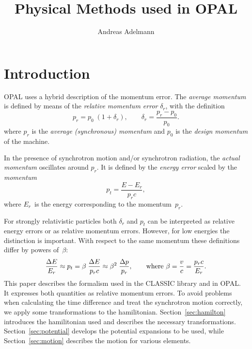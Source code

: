 \documentclass{report}
\begin{document}
\title{Physical Methods used in OPAL}
\author{Andreas Adelmann}

\maketitle


\section{Introduction}
OPAL uses a hybrid description of the momentum error.
The \textit{average momentum} is defined by means of the
\textit{relative momentum error} $\delta_r$, with the definition
\begin{equation}
  p_r = p_0\;(1+\delta_r), \qquad \delta_r = \frac{p_r - p_0}{p_0}.
\end{equation}
where $p_r$ is the \textit{average (synchronous) momentum} and $p_0$
is the \textit{design momentum} of the machine.

In the presence of synchrotron motion and/or synchrotron radiation,
the \textit{actual momentum} oscillates around $p_r$.
It is defined by the \textit{energy error} scaled by the
\textit{momentum} 
\begin{equation}
  p_t = \frac{E-E_r}{p_rc},
\end{equation}
where $E_r$~is the energy corresponding to the momentum~$p_r$.

For strongly relativistic particles both $\delta_r$ and $p_t$ can be
interpreted as relative energy errors or as relative momentum errors.
However, for low energies the distinction is important.
With respect to the same momentum these definitions differ by powers
of~$\beta$: 
\begin{equation}
  \frac{\Delta E}{E_r} \approx p_t = \beta\;\frac{\Delta E}{p_r c}
  \approx \beta^2\;\frac{\Delta p}{p_r},
  \qquad \hbox{where\ } \beta = \frac{v}{c} = \frac{p_r c}{E_r}.  
\end{equation}
This paper describes the formalism used in the CLASSIC library and in
OPAL. 
It expresses both quantities as relative momentum errors.
To avoid problems when calculating the time difference and treat the
synchrotron motion correctly,
we apply some transformations to the hamilitonian.
Section~\ref{sec:hamilton} introduces the hamilitonian used and
describes the necessary transformations. 
Section~\ref{sec:potential} develops the potential expansions to be
used,
while Section~\ref{sec:motion} describes the motion for various
elements.  
\end{document}
